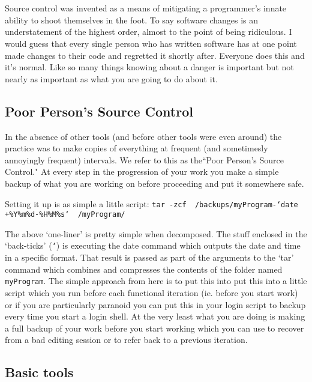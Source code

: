 \chapter[Source Control]{}

Source control was invented as a means of mitigating a programmer's innate ability to shoot themselves in the foot.
To say software changes is an understatement of the highest order, almost to the point of being ridiculous.  I would
guess that every single person who has written software has at one point made changes to their code and regretted it 
shortly after.  Everyone does this and it's normal.  Like so many things knowing about a danger is important but not 
nearly as important as what you are going to do about it.

\section{Poor Person's Source Control}{}

In the absence of other tools (and before other tools were even around) the practice was to make copies of everything
at frequent (and sometimesly annoyingly frequent) intervals.  We refer to this as the``Poor Person's Source Control."
At every step in the progression of your work you make a simple backup of what you are working on before proceeding and
put it somewhere safe.

Setting it up is as simple a little script:
	{\tt tar -zcf ~/backups/myProgram-`date +\%Y\%m\%d-\%H\%M\%s` ~/myProgram/}

The above `one-liner' is pretty simple when decomposed.  The stuff enclosed in the
`back-ticks' ({\tt `}) is executing the date command which outputs the date and time
in a specific format.  That result is passed as part of the arguments to the `tar'
command which combines and compresses the contents of the folder named {\tt myProgram}. 
The simple approach from here is to put this
into put this into a little script which you run before each functional iteration
(ie. before you start work) or if you are particularly paranoid you can put this
in your login script to backup every time you start a login shell.  At the very least
what you are doing is making a full backup of your work before you start working
which you can use to recover from a bad editing
session or to refer back to a previous iteration.

\section{Basic tools}
